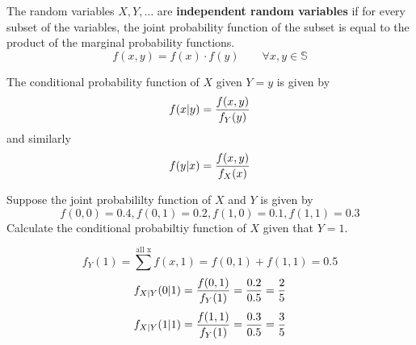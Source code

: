 \documentclass[english, 12pt]{article}
\begin{document}
\begin{defn}
The random variables $X,Y,\dots$ are \textbf{independent random variables} if for every subset of the variables, the joint probability function of the subset is equal to the product of the marginal probability functions.
\[f(x,y) = f(x) \cdot f(y)\qquad \forall x,y \in \mathbb{S}\]
\end{defn}

\begin{defn}
The conditional probability function of $X$ given $Y = y$ is given by
\[f(x|y) = \frac{f(x,y)}{f_Y(y)}\]
and similarly
\[f(y|x) = \frac{f(x,y)}{f_X(x)}\]
\end{defn}

\begin{exmp}
Suppose the joint probabililty function of $X$ and $Y$ is given by
\[f(0,0) = 0.4, f(0,1) = 0.2, f(1,0) = 0.1, f(1,1) = 0.3\]
Calculate the conditional probabiltiy function of $X$ given that $Y = 1$.

\begin{sol}
\[f_Y(1) = \sum^{\text{all x}} f(x,1) = f(0,1) + f(1,1) = 0.5\]
\[f_{X|Y}(0 | 1) = \frac{f(0,1)}{f_Y(1)} = \frac{0.2}{0.5} = \frac{2}{5}\]
\[f_{X|Y}(1|1) = \frac{f(1,1)}{f_Y(1)} = \frac{0.3}{0.5} = \frac{3}{5}\]
\end{sol}
\end{exmp}

\end{document}
